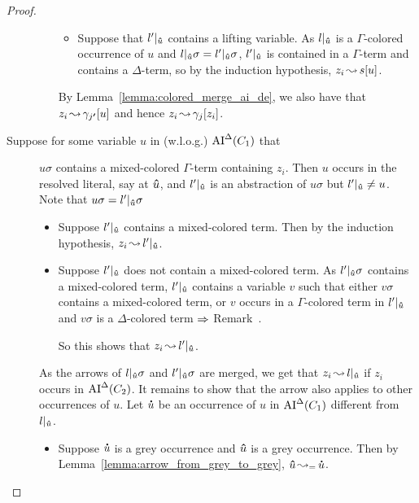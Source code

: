 \documentclass[,%
	paper=a4,%
	DIV9, %
	twoside=false,%
	liststotoc,
	bibtotoc,
	draft=false,%
	numbers=noendperiod
]{scrartcl}
\begin{document}
\begin{proof}
\begin{description}
\begin{itemize}
\begin{itemize}
						\item Suppose that $l'|_{\bm\hat u}$ contains a lifting variable.
							As $l|_{\bm\hat u}$ is a $\Gamma$-colored occurrence of $u$ and
							$l|_{\bm\hat u}\sigma = l'|_{\bm\hat u}\sigma$,
							$l'|_{\bm\hat u}$ is contained in a $\Gamma$-term and contains a $\Delta$-term, so 
							by the induction hypothesis, $z_i\operatorname{\leadsto} s[u]$.
					\end{itemize}

					By Lemma~\ref{lemma:colored_merge_ai_de}, we also have that $z_i\operatorname{\leadsto} \gamma_{j\bm '}[u]$ and hence $z_i \operatorname{\leadsto} \gamma_j[z_i]$.

			\end{itemize}



	\item[Suppose for some variable $u$ in (w.l.o.g.) $\operatorname{AI}^\Delta(C_1)$ that] $u\sigma$ contains a mixed-colored $\Gamma$-term containing $z_i$.
			Then $u$ occurs in the resolved literal, say at $\bm\hat u$, and $l'|_{\bm\hat u}$ is an abstraction of $u\sigma$ but $l'|_{\bm\hat u} \neq u$. 
			Note that $u\sigma = l'|_{\bm\hat u}\sigma$ 


			\begin{itemize}
				\item Suppose $l'|_{\bm\hat u}$ contains a mixed-colored term.
					Then by the induction hypothesis, $z_i \operatorname{\leadsto} l'|_{\bm\hat u}$.

				\item Suppose $l'|_{\bm\hat u}$ does not contain a mixed-colored term.
					As $l'|_{\bm\hat u}\sigma$ contains a mixed-colored term,
					$l'|_{\bm\hat u}$ contains a variable $v$ such that either $v\sigma$ contains a mixed-colored term, or $v$ occurs in a $\Gamma$-colored term in $l'|_{\bm\hat u}$ and $v\sigma$ is a $\Delta$-colored term
					$\Rightarrow$ Remark~\substremarkref.

					So this shows that $z_i \operatorname{\leadsto} l'|_{\bm\hat u}$. 
			\end{itemize}

			As the arrows of $l|_{\bm\hat u}\sigma$ and $l'|_{\bm\hat u}\sigma$ are merged, we get that $z_i \operatorname{\leadsto} l|_{\bm\hat u}$ if $z_i$ occurs in $\operatorname{AI}^\Delta(C_2)$.
			It remains to show that the arrow also applies to other occurrences of $u$.
			Let $\bm\dot u$ be an occurrence of $u$ in $\operatorname{AI}^\Delta(C_1)$ different from $l|_{\bm\hat u}$.
			\begin{itemize}
				\item Suppose $\bm\dot u$ is a grey occurrence and $\bm\hat u$ is a grey occurrence.
					Then by Lemma~\ref{lemma:arrow_from_grey_to_grey}, $\bm\hat u \operatorname{\leadsto_=} \bm\dot u$.


\end{itemize}
\end{description}
\end{proof}
\end{document}
